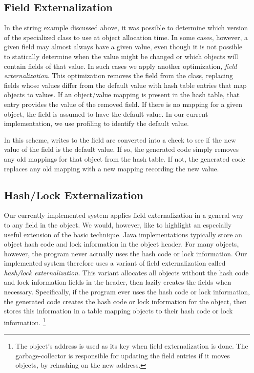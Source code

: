 \documentclass{acmconf}
\begin{document}
\subsection{Field Externalization}

In the string example discussed above, it was possible to determine
which version of the specialized class to use at object allocation
time. In some cases, however, a given field may almost always have
a given value, even though it is not possible to statically determine
when the value might be changed or which objects will contain fields of that 
value. In such cases we apply another optimization, 
{\em field externalization}. This optimization removes the field
from the class, replacing fields whose values differ from the default 
value with hash table entries that map objects to values. If an object/value
mapping is present in the hash table, that entry provides the 
value of the removed field. If there is no mapping for a given object,
the field is assumed to have the default value. 
In our current implementation, we use profiling 
to identify the default value. 

In this scheme, writes to the field are converted into a check to see
if the new value of the field is the default value. If so, the 
generated code simply removes any old mappings for that 
object from the hash table.
If not, the generated code replaces any old mapping with a new
mapping recording the new value. 

\subsection{Hash/Lock Externalization}

Our currently implemented system applies field externalization
in a general way to any field in the object. We would, however,
like to highlight an especially useful extension of the basic
technique. Java implementations typically store an object
hash code and lock information in the object header. For many
objects, however, the program never actually uses the hash code
or lock information. Our implemented system therefore uses
a variant of field externalization called {\em hash/lock 
externalization}. This variant allocates all objects 
without the hash code and lock information fields in the header,
then lazily creates the fields when necessary. 
Specifically, if the program ever uses the hash code or lock information, 
the generated code creates the hash code or lock information
for the object, then stores this information in a table
mapping objects to their hash code or lock information.%
\footnote{The object's address is used as its key when
  field externalization is done.  The garbage-collector is responsible
  for updating the field entries if it moves objects, by rehashing on
  the new address.}
\end{document}
